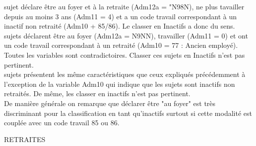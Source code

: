 \documentclass{book}
\begin{document}
 sujet déclare être au foyer et à la retraite (Adm12a = "N98N), ne plus tavailler depuis au moins 3 ans (Adm11 = 4) et a un code travail correspondant à un inactif non retraité (Adm10 + 85/86). Le classer en Inactifs a donc du sens. \\

 sujets déclarent être au foyer (Adm12a = N9NN), travailler (Adm11 = 0) et ont un code travail correspondant à un retraité (Adm10 = 77 : Ancien employé). Toutes les variables sont contradictoires. Classer ces sujets en Inactifs n'est pas pertinent.\\

 sujets présentent les même caractéristiques que ceux expliqués précédemment à l'exception de la variable Adm10 qui indique que les sujets sont inactifs non retraités. De même, les classer en inactifs n'est pas pertinent.\\

\noindent
De manière générale on remarque que déclarer être "au foyer" est très discriminant pour la classification en tant qu'inactifs surtout si cette modalité est couplée avec un code travail 85 ou 86.\\


\begin{center} RETRAITES \end{center}
\end{document}
